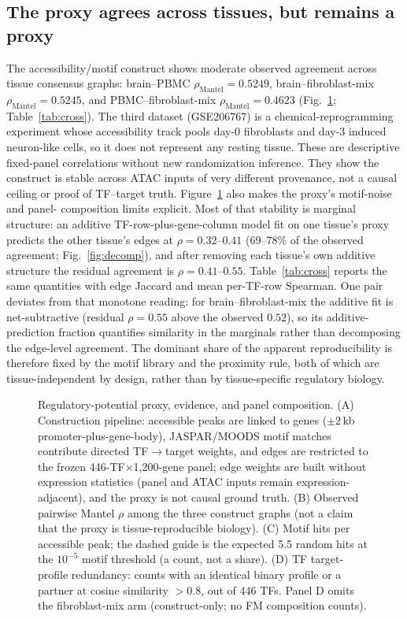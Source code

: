 \documentclass[fleqn,10pt,lineno]{wlpeerj}
\newcommand{\fitfig}[1]{\resizebox{\ifdim\width>\linewidth\linewidth\else\width\fi}{!}{#1}}
\begin{document}
\subsection{The proxy agrees across tissues, but remains a proxy}
The accessibility/motif construct shows moderate observed agreement across tissue consensus graphs:
brain--PBMC $\rho_{\mathrm{Mantel}}=0.5249$, brain--fibroblast-mix $\rho_{\mathrm{Mantel}}=0.5245$, and PBMC--fibroblast-mix
$\rho_{\mathrm{Mantel}}=0.4623$ (Fig.~\ref{fig:proxy}; Table~\ref{tab:cross}). The third dataset (GSE206767) is a
chemical-reprogramming experiment whose accessibility track pools day-0 fibroblasts and day-3
induced neuron-like cells, so it does not represent any resting tissue. These are descriptive
fixed-panel correlations without new randomization inference. They show the construct is stable
across ATAC inputs of very different provenance, not a causal ceiling or
proof of TF--target truth. Figure~\ref{fig:proxy} also makes the proxy's motif-noise and panel-
composition limits explicit. Most of that stability is marginal structure: an additive
TF-row-plus-gene-column model fit on one tissue's proxy predicts the other tissue's edges at
$\rho=0.32$--$0.41$ (69--78\% of the observed agreement; Fig.~\ref{fig:decomp}), and after removing each tissue's own
additive structure the residual agreement is $\rho=0.41$--$0.55$.
Table~\ref{tab:cross} reports the same quantities with edge Jaccard and mean per-TF-row Spearman.
One pair deviates from that
monotone reading: for brain--fibroblast-mix the additive fit is net-subtractive (residual
$\rho=0.55$ above the observed $0.52$), so its additive-prediction fraction quantifies similarity
in the marginals rather than decomposing the edge-level agreement. The dominant share of the
apparent reproducibility is therefore fixed by the motif library and the proximity rule, both of
which are tissue-independent by design, rather than by tissue-specific regulatory biology.

\begin{figure}[!tbp]\centering
\fitfig{}
\caption{Regulatory-potential proxy, evidence, and panel composition. (A) Construction pipeline:
accessible peaks are linked to genes ($\pm2$\,kb promoter-plus-gene-body), JASPAR/MOODS motif
matches contribute directed TF$\rightarrow$target weights, and edges are restricted to the
frozen 446-TF$\times$1{,}200-gene panel; edge weights are built without expression statistics
(panel and ATAC inputs remain expression-adjacent), and the proxy is not causal ground truth.
(B) Observed pairwise Mantel $\rho$ among the three construct graphs (not a claim that the
proxy is tissue-reproducible biology).
(C) Motif hits per accessible peak; the dashed guide is the expected 5.5 random hits at the
$10^{-5}$ motif threshold (a count, not a share). (D) TF target-profile redundancy: counts with
an identical binary profile or a partner at cosine similarity $>0.8$, out of 446 TFs.
Panel D omits the fibroblast-mix arm (construct-only; no FM composition counts).}\label{fig:proxy}
\end{figure}
\FloatBarrier
\end{document}
